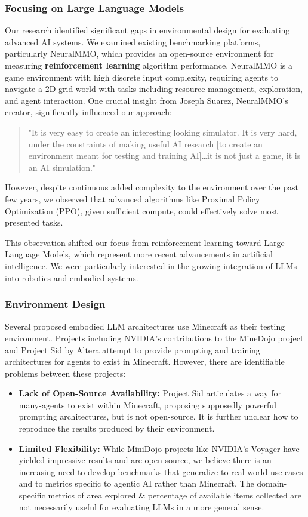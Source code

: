 \documentclass{article}
\begin{document}
\subsubsection{Focusing on Large Language Models}
Our research identified significant gaps in environmental design for evaluating advanced AI systems.
We examined existing benchmarking platforms, particularly NeuralMMO, which provides an open-source environment for measuring \textbf{reinforcement learning} algorithm performance.
NeuralMMO is a game environment with high discrete input complexity, requiring agents to navigate a 2D grid world with tasks including resource management, exploration, and agent interaction.
One crucial insight from Joseph Suarez, NeuralMMO's creator, significantly influenced our approach:
\begin{quote}
    "It is very easy to create an interesting looking simulator. It is very hard, under the constraints of making useful AI research [to create an environment meant for testing and training AI]…it is not just a game, it is an AI simulation."
\end{quote}
However, despite continuous added complexity to the environment over the past few years, we observed that advanced algorithms like Proximal Policy Optimization (PPO), given sufficient compute, could effectively solve most presented tasks.

This observation shifted our focus from reinforcement learning toward Large Language Models, which represent more recent advancements in artificial intelligence.
We were particularly interested in the growing integration of LLMs into robotics and embodied systems.

\subsubsection{Environment Design}
Several proposed embodied LLM architectures use Minecraft as their testing environment.
Projects including NVIDIA's contributions to the MineDojo project and Project Sid by Altera attempt to provide prompting and training architectures for agents to exist in Minecraft.
However, there are identifiable problems between these projects:
\begin{itemize}
    \item \textbf{Lack of Open-Source Availability:}
    Project Sid articulates a way for many-agents to exist within Minecraft, proposing supposedly powerful prompting architectures, but is not open-source.
    It is further unclear how to reproduce the results produced by their environment.
    \item \textbf{Limited Flexibility:}
    While MiniDojo projects like NVIDIA's Voyager have yielded impressive results and are open-source, we believe there is an increasing need to develop benchmarks that generalize to real-world use cases and to metrics specific to agentic AI rather than Minecraft.
    The domain-specific metrics of area explored \& percentage of available items collected are not necessarily useful for evaluating LLMs in a more general sense.
\end{itemize}
\end{document}
